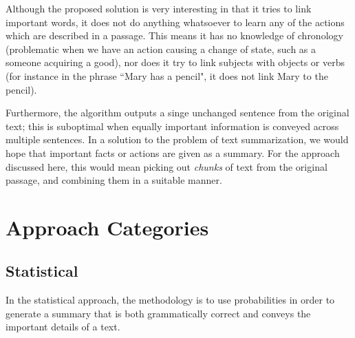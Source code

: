 \mbox{}

Although the proposed solution is very interesting in that it tries to link important words, it does not do anything whatsoever to learn any of the actions which are described in a passage. This means it has no knowledge of chronology (problematic when we have an action causing a change of state, such as a someone acquiring a good), nor does it try to link subjects with objects or verbs (for instance in the phrase ``Mary has a pencil", it does not link Mary to the pencil).

Furthermore, the algorithm outputs a singe unchanged sentence from the original text; this is suboptimal when equally important information is conveyed across multiple sentences. In a solution to the problem of text summarization, we would hope that important facts or actions are given as a summary. For the approach discussed here, this would mean picking out \textit{chunks} of text from the original passage, and combining them in a suitable manner.

\section{Approach Categories}

\subsection{Statistical}

In the statistical approach, the methodology is to use probabilities in order to generate a summary that is both grammatically correct and conveys the important details of a text.

\mbox{}

